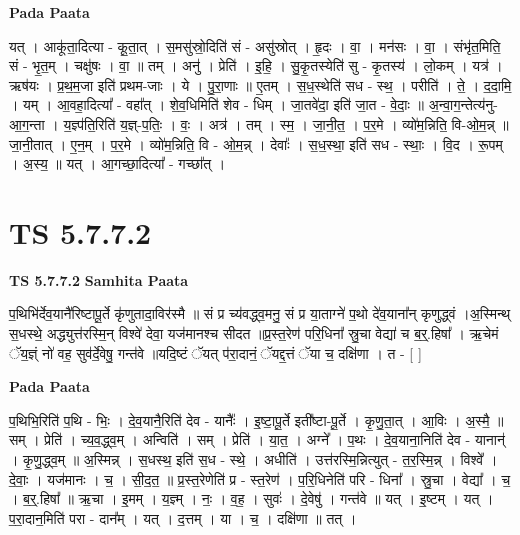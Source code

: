 \documentclass[17pt]{extarticle}
\begin{document}
\textbf{Pada Paata} \newline

यत् । आकू॑ता॒दित्या - कू॒ता॒त् । स॒मसु॑स्रो॒दिति॑ सं - असु॑स्रोत् । हृ॒दः । वा॒ । मन॑सः । वा॒ । संभृ॑त॒मिति॒ सं - भृ॒त॒म् । चक्षु॑षः । वा॒ ॥ तम् । अनु॑ । प्रेति॑ । इ॒हि॒ । सु॒कृ॒तस्येति॑ सु - कृ॒तस्य॑ । लो॒कम् । यत्र॑ । ऋष॑यः । प्र॒थ॒म॒जा इति॑ प्रथम-जाः । ये । पु॒रा॒णाः ॥ ए॒तम् । स॒ध॒स्थेति॑ सध - स्थ॒ । परीति॑ । ते॒ । द॒दा॒मि॒ । यम् । आ॒वहा॒दित्या᳚ - वहा᳚त् । शे॒व॒धिमिति॑ शेव - धिम् । जा॒तवे॑दा॒ इति॑ जा॒त - वे॒दाः॒ ॥ अ॒न्वा॒ग॒न्तेत्य॑नु-आ॒ग॒न्ता । य॒ज्ञ्प॑ति॒रिति॑ य॒ज्ञ्-प॒तिः॒ । वः॒ । अत्र॑ । तम् । स्म॒ । जा॒नी॒त॒ । प॒र॒मे । व्यो॑म॒न्निति॒ वि-ओ॒म॒न्न् ॥ जा॒नी॒तात् । ए॒न॒म् । प॒र॒मे । व्यो॑म॒न्निति॒ वि - ओ॒म॒न्न् । देवाः᳚ । स॒ध॒स्था॒ इति॑ सध - स्थाः॒ । वि॒द । रू॒पम् । अ॒स्य॒ ॥ यत् । आ॒गच्छा॒दित्या᳚ - गच्छा᳚त् ।  \newline





\section{ TS 5.7.7.2 }

\textbf{TS 5.7.7.2 } \newline
\textbf{Samhita Paata} \newline

प॒थिभि॑र्देव॒यानै॑रिष्टापू॒र्ते कृ॑णुतादा॒विर॑स्मै ॥ सं प्र च्य॑वद्ध्व॒मनु॒ सं प्र या॒ताग्ने॑ प॒थो दे॑व॒याना᳚न् कृणुद्ध्वं ।अ॒स्मिन्थ् स॒धस्थे॒ अद्ध्युत्त॑रस्मि॒न् विश्वे॑ देवा॒ यज॑मानश्च सीदत ॥प्र॒स्त॒रेण॑ परि॒धिना᳚ स्रु॒चा वेद्या॑ च ब॒र्॒.हिषा᳚ । ऋ॒चेमं ॅय॒ज्ञ्ं नो॑ वह॒ सुव॑र्दे॒वेषु॒ गन्त॑वे ॥यदि॒ष्टं ॅयत् प॑रा॒दानं॒ ॅयद्द॒त्तं ॅया च॒ दक्षि॑णा । त - [  ] \newline

\textbf{Pada Paata} \newline

प॒थिभि॒रिति॑ प॒थि - भिः॒ । दे॒व॒यानै॒रिति॑ देव - यानैः᳚ । इ॒ष्टा॒पू॒र्ते इती᳚ष्टा-पू॒र्ते । कृ॒णु॒ता॒त् । आ॒विः । अ॒स्मै॒ ॥ सम् । प्रेति॑ । च्य॒व॒द्ध्व॒म् । अन्विति॑ । सम् । प्रेति॑ । या॒त॒ । अग्ने᳚ । प॒थः । दे॒व॒याना॒निति॑ देव - यानान्॑ । कृ॒णु॒द्ध्व॒म् ॥ अ॒स्मिन्न् । स॒धस्थ॒ इति॑ स॒ध - स्थे॒ । अधीति॑ । उत्त॑रस्मि॒न्नित्युत् - त॒र॒स्मि॒न्न् । विश्वे᳚ । दे॒वाः॒ । यज॑मानः । च॒ । सी॒द॒त॒ ॥ प्र॒स्त॒रेणेति॑ प्र - स्त॒रेण॑ । प॒रि॒धिनेति॑ परि - धिना᳚ । स्रु॒चा । वेद्या᳚ । च॒ । ब॒र्॒.हिषा᳚ ॥ ऋ॒चा । इ॒मम् । य॒ज्ञ्म् । नः॒ । व॒ह॒ । सुवः॑ । दे॒वेषु॑ । गन्त॑वे ॥ यत् । इ॒ष्टम् । यत् । प॒रा॒दान॒मिति॑ परा - दान᳚म् । यत् । द॒त्तम् । या । च॒ । दक्षि॑णा ॥ तत् ।  \newline
\end{document}
